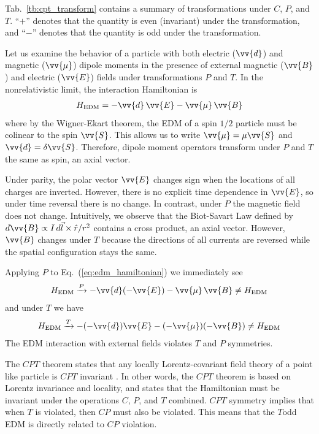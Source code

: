 Tab.~\ref{tb:cpt_transform} contains a summary of transformations under $C$, $P$, and $T$. ``$+$'' denotes that the quantity is even (invariant) under the transformation, and ``$-$'' denotes that the quantity is odd under the transformation.

Let us examine the behavior of a particle with both electric ($\vv{d}$) and magnetic ($\vv{\mu}$) dipole moments in the presence of external magnetic ($\vv{B}$) and electric ($\vv{E}$) fields under transformations $P$ and $T$. In the nonrelativistic limit, the interaction Hamiltonian is 
%
\begin{gather}
    H_\text{EDM} = -\vv{d}\,\vv{E}-\vv{\mu}\,\vv{B} \label{eq:edm_hamiltonian}
\end{gather}
%
where by the Wigner-Ekart theorem, the EDM of a spin $1/2$ particle must be colinear to the spin $\vv{S}$. This allows us to write $\vv{\mu}=\mu\vv{S}$ and $\vv{d}=\delta\vv{S}$. Therefore, dipole moment operators transform under $P$ and $T$ the same as spin, an axial vector.

Under parity, the polar vector $\vv{E}$ changes sign when the locations of all charges are inverted. However, there is no explicit time dependence in $\vv{E}$, so under time reversal there is no change. In contrast, under $P$ the magnetic field does not change. Intuitively, we observe that the Biot-Savart Law defined by $d\vv{B}\propto I\,d\vec{l} \times \hat{r} /r^2$ contains a cross product, an axial vector. However, $\vv{B}$ changes under $T$ because the directions of all currents are reversed while the spatial configuration stays the same. 

Applying $P$ to Eq.~(\ref{eq:edm_hamiltonian}) we immediately see
%
\begin{gather}
    H_\text{EDM}\xrightarrow{P} -\vv{d}(-\vv{E}) - \vv{\mu}\,\vv{B} \neq H_\text{EDM}
\end{gather}
%
and under $T$ we have
%
\begin{gather}
    H_\text{EDM}\xrightarrow{T} -(-\vv{d})\vv{E} - (-\vv{\mu})(-\vv{B}) \neq H_\text{EDM}
\end{gather}
%
The EDM interaction with external fields violates $T$ and $P$ symmetries. 

The $CPT$ theorem states that any locally Lorentz-covariant field theory of a point like particle is $CPT$ invariant \cite{LUDERS19571, schmidt-wellenburg_quest_2017, cp_violation_wo_strangeness}. In other words, the $CPT$ theorem is based on Lorentz invariance and locality, and states that the Hamiltonian must be invariant under the operations $C$, $P$, and $T$ combined. $CPT$ symmetry implies that when $T$ is violated, then $CP$ must also be violated. This means that the $T$\textendash odd EDM is directly related to $CP$ violation.


